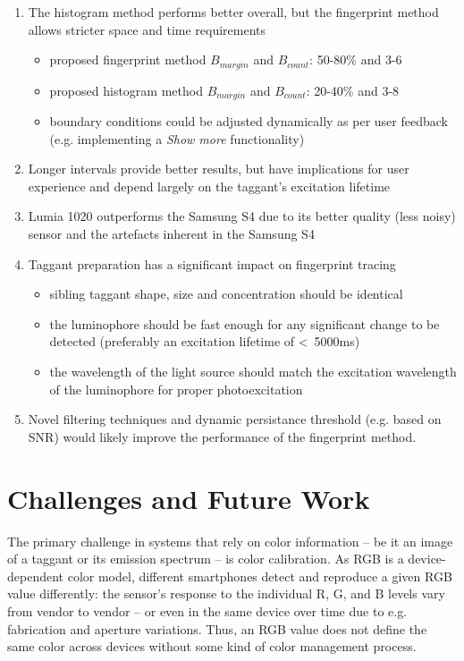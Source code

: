 \documentclass[thesis.tex]{subfiles}
\begin{document}
\begin{enumerate}
  \item The histogram method performs better overall, but the fingerprint method allows stricter space and time requirements
    \begin{itemize}
      \item proposed fingerprint method $B_{margin}$ and $B_{count}$: 50-80\% and 3-6
      \item proposed histogram method $B_{margin}$ and $B_{count}$: 20-40\% and 3-8
      \item boundary conditions could be adjusted dynamically as per user feedback (e.g. implementing a \emph{Show more} functionality)
    \end{itemize}
  \item Longer intervals provide better results, but have implications for user experience and depend largely on the taggant's excitation lifetime
  \item Lumia 1020 outperforms the Samsung S4 due to its better quality (less noisy) sensor and the artefacts inherent in the Samsung S4
  \item Taggant preparation has a significant impact on fingerprint tracing
    \begin{itemize}
      \item sibling taggant shape, size and concentration should be identical
      \item the luminophore should be fast enough for any significant change to be detected (preferably an excitation lifetime of \textless\ 5000ms)
      \item the wavelength of the light source should match the excitation wavelength of the luminophore for proper photoexcitation
    \end{itemize}
  \item Novel filtering techniques and dynamic persistance threshold (e.g. based on SNR) would likely improve the performance of the fingerprint method.
\end{enumerate}

\section{Challenges and Future Work}

The primary challenge in systems that rely on color information -- be it an image of a taggant or its emission spectrum -- is color calibration. As RGB is a device-dependent color model, different smartphones detect and reproduce a given RGB value differently: the sensor's response to the individual R, G, and B levels vary from vendor to vendor -- or even in the same device over time due to e.g. fabrication and aperture variations. Thus, an RGB value does not define the same color across devices without some kind of color management process.
\end{document}
